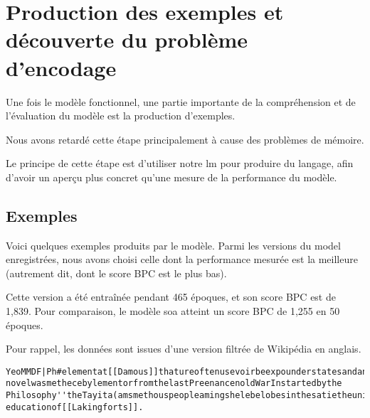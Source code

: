 \section{Production des exemples et découverte du problème d'encodage}
Une fois le modèle fonctionnel, une partie importante de la compréhension et de l'évaluation du modèle est la production d'exemples.

Nous avons retardé cette étape principalement à cause des problèmes de mémoire.

Le principe de cette étape est d'utiliser notre \gls{lm} pour produire du langage, afin d'avoir un aperçu plus concret qu'une mesure de la performance du modèle.

\subsection{Exemples}
Voici quelques exemples produits par le modèle. 
Parmi les versions du \gls{model} enregistrées, nous avons choisi celle dont la performance mesurée est la meilleure (autrement dit, dont le score BPC est le plus bas).

Cette version a été entraînée pendant 465 époques, et son score BPC est de 1,839.
Pour comparaison, le modèle \gls{soa} atteint un score BPC de 1,255 en 50 époques.

Pour rappel, les données sont issues d'une version filtrée de Wikipédia en anglais.

\begin{lstlisting}[caption={Exemple 1~: une suite de caractères difficilement compréhensibles},label=gmsnn_ex1]
YeoMMDF|Ph#elementat[[Damous]]thatureoftenusevoirbeexpounderstatesandanumberofhisworkformembersothan novelwasmethecebylementorfromthelastPreenancenoldWarInstartedbythe Philosophy''theTayita(amsmethouspeopleamingshelebelobesinthesatietheuniversalistscientis educationof[[Lakingforts]].
\end{lstlisting}

